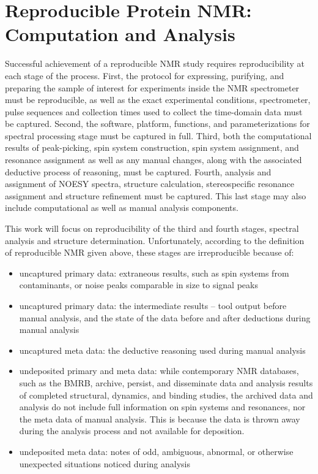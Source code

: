 \documentclass[a4paper]{report}
\begin{document}
\section{Reproducible Protein NMR:  Computation and Analysis}
Successful achievement of a reproducible NMR study requires reproducibility at 
each stage of the process.  First, the protocol for expressing, purifying, and 
preparing the sample of interest for experiments inside the NMR spectrometer 
must be reproducible, as well as the exact experimental conditions, 
spectrometer, pulse sequences and collection times used to collect the 
time-domain data must be captured.  Second, the software, platform, functions, 
and parameterizations for spectral processing stage must be captured in full.  
Third, both the computational results of peak-picking, spin system construction,
spin system assignment, and resonance assignment as well as any manual changes, 
along with the associated deductive process of reasoning, must be captured.  
Fourth, analysis and assignment of NOESY spectra, structure calculation, 
stereospecific resonance assignment and structure refinement must be captured.  
This last stage may also include computational as well as manual analysis 
components.  

This work will focus on reproducibility of the third and fourth stages, 
spectral analysis and structure determination.  Unfortunately, according to 
the definition of reproducible NMR given above, these stages are irreproducible 
because of:
\begin{itemize}
  \item uncaptured primary data: extraneous results, such as spin systems from 
  contaminants, or noise peaks comparable in size to signal peaks
  \item uncaptured primary data: the intermediate results -- tool output before 
  manual analysis, and the state of the data before and after deductions during 
  manual analysis
  \item uncaptured meta data:  the deductive reasoning used during manual analysis
  \item undeposited primary and meta data: while contemporary NMR databases, 
  such as the BMRB, archive, persist, and disseminate data and analysis 
  results of completed structural, dynamics, and binding studies, the 
  archived data and analysis do not include full information on spin systems 
  and resonances, nor the meta data of manual analysis.  This is because the 
  data is thrown away during the analysis process and not available for deposition.
  \item undeposited meta data: notes of odd, ambiguous, abnormal, or 
  otherwise unexpected situations noticed during analysis
\end{itemize}
\end{document}
